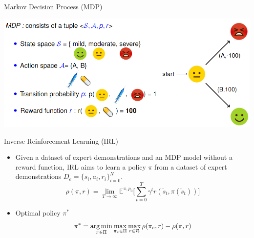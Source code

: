 
\begin{block}{Markov Decision Process (MDP)}
\vspace{0.15cm}
    \begin{center}
    \includegraphics[width=0.95\linewidth]{fig/mdp.png}    
  \end{center}
  \vspace{0.15cm}
\end{block}

\begin{block}{\normalsize{Inverse Reinforcement Learning (IRL)}}
  \begin{itemize}
     \item Given a dataset of expert demonstrations and an MDP model without a reward function, IRL aims to learn a policy $\pi$ 
       from a dataset of expert demonstrations $D_e = \{ s_i, a_i, r_i \}_{i=0}^{N}$.
     \[
       \rho(\pi, r) = \lim_{T \to \infty} \mathbb{E}^{\pi, p_0} \lbrack \sum_{t=0}^{T} \gamma^t r(\tilde{s}_t, \pi(\tilde{s}_t)) \rbrack
     \]
     \item Optimal policy $\pi^* $
     \[
       \pi^* = \operatorname*{arg\,min}_{\pi \in \Pi} \max_{\pi_e \in \Pi} \max_{r \in \mathcal{R}} \rho(\pi_e, r) - \rho(\pi, r)
     \]
    
\end{itemize}
\end{block}





